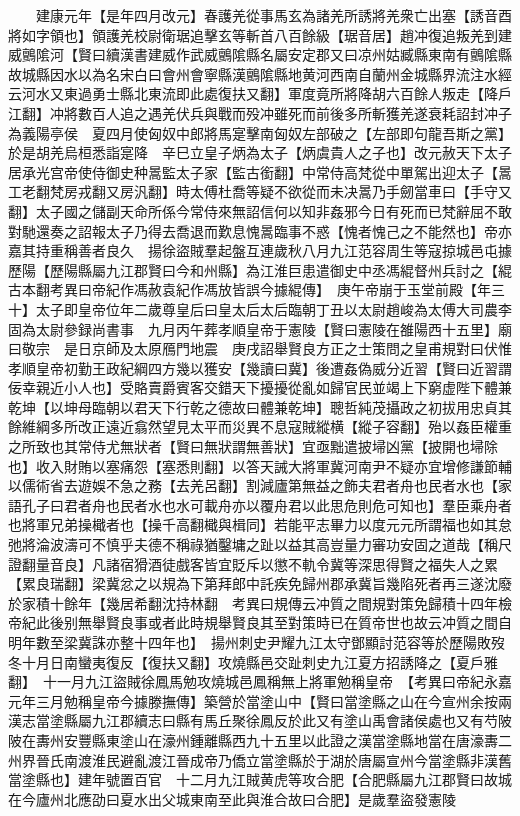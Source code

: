 　　建康元年【是年四月改元】春護羌從事馬玄為諸羌所誘將羌衆亡出塞【誘音酉將如字領也】領護羌校尉衛琚追擊玄等斬首八百餘級【琚音居】趙冲復追叛羌到建威鸇隂河【賢曰續漢書建威作武威鸇隂縣名屬安定郡又曰凉州姑臧縣東南有鸇隂縣故城縣因水以為名宋白曰會州會寧縣漢鸇隂縣地黄河西南自蘭州金城縣界流注水經云河水又東過勇士縣北東流即此處復扶又翻】軍度竟所將降胡六百餘人叛走【降戶江翻】冲將數百人追之遇羌伏兵與戰而殁冲雖死而前後多所斬獲羌遂衰耗詔封冲子為義陽亭侯　夏四月使匈奴中郎將馬寔擊南匈奴左部破之【左部即句龍吾斯之黨】於是胡羌烏桓悉詣寔降　辛巳立皇子炳為太子【炳虞貴人之子也】改元赦天下太子居承光宫帝使侍御史种暠監太子家【監古銜翻】中常侍高梵從中單駕出迎太子【暠工老翻梵房戎翻又房汎翻】時太傅杜喬等疑不欲從而未决暠乃手劒當車曰【手守又翻】太子國之儲副天命所係今常侍來無詔信何以知非姦邪今日有死而已梵辭屈不敢對馳還奏之詔報太子乃得去喬退而歎息愧暠臨事不惑【愧者愧己之不能然也】帝亦嘉其持重稱善者良久　揚徐盜賊羣起盤互連歲秋八月九江范容周生等寇掠城邑屯據歷陽【歷陽縣屬九江郡賢曰今和州縣】為江淮巨患遣御史中丞馮緄督州兵討之【緄古本翻考異曰帝紀作馮赦袁紀作馮放皆誤今據緄傳】　庚午帝崩于玉堂前殿【年三十】太子即皇帝位年二歲尊皇后曰皇太后太后臨朝丁丑以太尉趙峻為太傅大司農李固為太尉參録尚書事　九月丙午葬孝順皇帝于憲陵【賢曰憲陵在雒陽西十五里】廟曰敬宗　是日京師及太原鴈門地震　庚戌詔舉賢良方正之士策問之皇甫規對曰伏惟孝順皇帝初勤王政紀綱四方幾以獲安【幾讀曰冀】後遭姦偽威分近習【賢曰近習謂佞幸親近小人也】受賂賣爵賓客交錯天下擾擾從亂如歸官民並竭上下窮虚陛下體兼乾坤【以坤母臨朝以君天下行乾之德故曰體兼乾坤】聰哲純茂攝政之初拔用忠貞其餘維綱多所改正遠近翕然望見太平而災異不息寇賊縱横【縱子容翻】殆以姦臣權重之所致也其常侍尤無狀者【賢曰無狀謂無善狀】宜亟黜遣披埽凶黨【披開也埽除也】收入財賄以塞痛怨【塞悉則翻】以答天誡大將軍冀河南尹不疑亦宜增修謙節輔以儒術省去遊娛不急之務【去羌呂翻】割減廬第無益之飾夫君者舟也民者水也【家語孔子曰君者舟也民者水也水可載舟亦以覆舟君以此思危則危可知也】羣臣乘舟者也將軍兄弟操檝者也【操千高翻檝與楫同】若能平志畢力以度元元所謂福也如其怠弛將淪波濤可不慎乎夫德不稱祿猶鑿墉之趾以益其高豈量力審功安固之道哉【稱尺證翻量音良】凡諸宿猾酒徒戲客皆宜貶斥以懲不軌令冀等深思得賢之福失人之累【累良瑞翻】梁冀忿之以規為下第拜郎中託疾免歸州郡承冀旨幾陷死者再三遂沈廢於家積十餘年【幾居希翻沈持林翻　考異曰規傳云冲質之間規對策免歸積十四年檢帝紀此後别無舉賢良事或者此時規舉賢良其至對策時已在質帝世也故云冲質之間自明年數至梁冀誅亦整十四年也】　揚州刺史尹耀九江太守鄧顯討范容等於歷陽敗歿　冬十月日南蠻夷復反【復扶又翻】攻燒縣邑交趾刺史九江夏方招誘降之【夏戶雅翻】　十一月九江盜賊徐鳳馬勉攻燒城邑鳳稱無上將軍勉稱皇帝　【考異曰帝紀永嘉元年三月勉稱皇帝今據滕撫傳】築營於當塗山中【賢曰當塗縣之山在今宣州余按兩漢志當塗縣屬九江郡續志曰縣有馬丘聚徐鳳反於此又有塗山禹會諸侯處也又有芍陂陂在夀州安豐縣東塗山在濠州鍾離縣西九十五里以此證之漢當塗縣地當在唐濠夀二州界晉氏南渡淮民避亂渡江晉成帝乃僑立當塗縣於于湖於唐屬宣州今當塗縣非漢舊當塗縣也】建年號置百官　十二月九江賊黄虎等攻合肥【合肥縣屬九江郡賢曰故城在今廬州北應劭曰夏水出父城東南至此與淮合故曰合肥】是歲羣盜發憲陵


